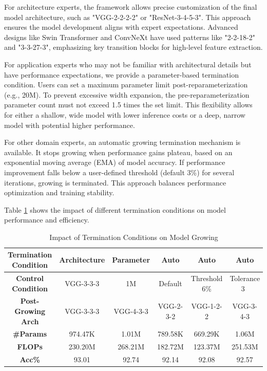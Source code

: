 \documentclass[preprint,12pt]{elsarticle}
\begin{document}
For architecture experts, the framework allows precise customization of the final model architecture, such as "VGG-2-2-2-2" or "ResNet-3-4-5-3". This approach ensures the model development aligns with expert expectations. Advanced designs like Swin Transformer and ConvNeXt have used patterns like "2-2-18-2" and "3-3-27-3", emphasizing key transition blocks for high-level feature extraction.

For application experts who may not be familiar with architectural details but have performance expectations, we provide a parameter-based termination condition. Users can set a maximum parameter limit post-reparameterization (e.g., 20M). To prevent excessive width expansion, the pre-reparameterization parameter count must not exceed 1.5 times the set limit. This flexibility allows for either a shallow, wide model with lower inference costs or a deep, narrow model with potential higher performance.

For other domain experts, an automatic growing termination mechanism is available. It stops growing when performance gains plateau, based on an exponential moving average (EMA) \cite{ema} of model accuracy. If performance improvement falls below a user-defined threshold (default 3\%) for several iterations, growing is terminated. This approach balances performance optimization and training stability.

Table \ref{table:termination_conditions} shows the impact of different termination conditions on model performance and efficiency.

\begin{table}[ht]
\centering
\tiny
\renewcommand{\arraystretch}{1.3}
\begin{adjustbox}{center}
\begin{tabular}{c|ccccc}
\hline
\textbf{Termination Condition} & \textbf{Architecture} & \textbf{Parameter} & \textbf{Auto} & \textbf{Auto} & \textbf{Auto} \\
\hline
\textbf{Control Condition} & VGG-3-3-3 & 1M & Default & Threshold 6\% & Tolerance 3\ \\
\hline
\textbf{Post-Growing Arch} & VGG-3-3-3 & VGG-4-3-3 & VGG-2-3-2 & VGG-1-2-2 & VGG-3-4-3 \\
\hline
\textbf{\#Params} & 974.47K & 1.01M & 789.58K & 669.29K & 1.06M \\
\hline
\textbf{FLOPs} & 230.20M & 268.21M & 182.72M & 123.37M & 251.53M \\
\hline
\textbf{Acc\%} & 93.01 & 92.74 & 92.14 & 92.08 & 92.57 \\
\hline
\end{tabular}
\end{adjustbox}
\caption{Impact of Termination Conditions on Model Growing}
\label{table:termination_conditions}
\end{table}
\end{document}
